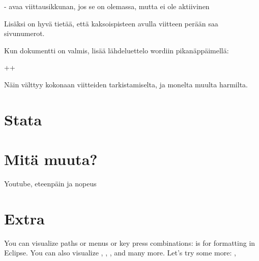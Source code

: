 \documentclass[a5paper,9pt]{scrartcl}
\begin{document}
    - avaa viittausikkunan, jos se on olemassa, mutta ei ole aktiivinen
    
    
    Lisäksi on hyvä tietää, että kaksoispisteen \keys{:} avulla viitteen perään saa sivunumerot.
    
    Kun dokumentti on valmis, lisää lähdeluettelo wordiin pikanäppäimellä:
    
    ++
    
    Näin välttyy kokonaan viitteiden tarkistamiselta, ja monelta muulta harmilta.
    
    \section{Stata}
    
    
    \section{Mitä muuta?}
    Youtube, eteenpäin ja nopeus
    
    \section{Extra}
    You can visualize paths 
    or menus  or key
    press combinations:  is for formatting
    in Eclipse.
    You can also visualize \keys{\tab}, \keys{\capslock}, \keys{\Space}, 
    \keys{\arrowkeyup} and many more.
    Let's try some more: ,  
\end{document}
